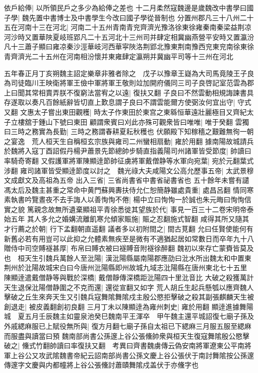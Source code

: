 依戶給俸|{
	以所領民戶之多少為給俸之差也}
十二月柔然寇魏邊是歲魏改中書學曰國子學|{
	魏先置中書博士及中書學生今改曰國子學從晉制也}
分置州郡凡三十八州二十五在河南十三在河北|{
	河南二十五州青南青兖齊濟光豫洛徐東徐雍秦南秦梁益荆凉河沙時又置華陜夏岐班郢凡二十五河北十三州司并肆定相冀幽燕營平安時又置瀛汾凡十三蕭子顯曰雍凉秦沙涇華岐河西華寜陜洛荆郢北豫東荆南豫西兖東兖南徐東徐青齊濟光二十五州在河南相汾懷并東雍肆定瀛朔并冀幽平司等十三州在河北}


五年春正月丁亥朔魏主詔定樂章非雅者除之　戊子以豫章王嶷為大司馬竟陵王子良為司徒臨川王映衛將軍王儉中軍將軍王敬則竝加開府儀同三司子良啓記室范雲為郡上曰聞其常相賣弄朕不復窮法當宥之以遠|{
	復扶又翻}
子良曰不然雲動相規誨諫書具存遂取以奏凡百餘紙辭皆切直上歎息謂子良曰不謂雲能爾方使弼汝何宜出守|{
	守式又翻}
文惠太子嘗出東田觀穫|{
	時太子作東田於東宫之東緜恒華遠壯麗極目又齊紀太子立樓舘于鍾山下號曰東田}
顧謂衆賓曰刈此亦殊可觀衆皆曰唯唯|{
	唯于癸翻}
雲獨曰三時之務實為長勤|{
	三時之務謂春耕夏耘秋穫也}
伏願殿下知稼穡之艱難無徇一朝之宴逸　荒人桓天生自稱桓玄宗族與雍司二州蠻相扇動|{
	雍於用翻}
據南陽故城請兵於魏將入寇丁酉詔假丹楊尹蕭景先節總帥步騎直指義陽司州諸軍皆受節度|{
	帥讀曰率騎奇寄翻}
又假護軍將軍陳顯逹節帥征虜將軍戴僧静等水軍向宛葉|{
	宛於元翻葉式涉翻}
雍司諸軍皆受顯逹節度以討之　魏光祿大夫咸陽文公高允歷事五帝|{
	太武景穆文成獻文及高祖為五帝}
出入三省|{
	三省尚書省中書省祕書省也}
五十餘年未嘗有譴馮太后及魏主甚重之常命中黄門蘇興夀扶侍允仁恕簡静雖處貴重|{
	處昌呂翻}
情同寒素執書吟覽晝夜不去手誨人以善恂恂不倦|{
	楊中立曰恂恂一於誠也朱元晦曰恂恂信實之貌}
篤親念故無所遺棄顯祖平青徐悉徙其望族於代|{
	事見一百三十二卷宋明帝泰始五年}
其人多允之婚媾流離飢寒允傾家賑施|{
	賑之忍翻施式智翻}
咸得其所又隨其才行薦之於朝|{
	行下孟翻朝直遥翻}
議者多以初附間之|{
	間古莧翻}
允曰任賢使能何有新舊必若有用豈可以此抑之允體素無疾至是微有不適猶起居如常數日而卒年九十八贈侍中司空賻襚甚厚|{
	布帛曰賻衣被曰襚賻音附襚徐醉翻}
魏初以來存亡蒙賚皆莫及也　桓天生引魏兵萬餘人至沘陽|{
	漢沘陽縣屬南陽郡應劭曰沘水所出魏太和中置東荆州於沘陽故城宋白曰今唐州沘陽縣即州故城九域志沘陽縣在唐州東北七十五里}
陳顯逹遣戴僧静等與戰於深橋|{
	戴僧靜傳深橋距沘陽四十里沘音比}
大破之殺獲萬計天生退保沘陽僧静圍之不克而還|{
	還從宣翻又如字}
荒人胡丘生起兵懸瓠以應齊魏人擊破之丘生來奔天生又引魏兵寇舞隂舞隂戍主殷公愍拒擊破之殺其副張麒麟天生被創退走|{
	被皮義翻創初良翻}
三月丁未以陳顯逹為雍州刺史|{
	雍於用翻}
顯逹進據舞陽城　夏五月壬辰魏主如靈泉池癸巳魏南平王渾卒　甲午魏主還平城詔復七廟子孫及外戚緦麻服已上賦役無所與|{
	復方月翻七廟子孫自太祖已下緦麻三月服五服至緦麻而服盡與讀當曰預}
魏南部尚書公孫邃上谷公張儵帥衆與桓天生復寇舞隂殷公愍擊破之|{
	儵式竹翻帥讀曰率復扶又翻　考異曰齊書魏虜傳云偽安南將軍遼東公平南將軍上谷公又攻武隂魏書帝紀云詔南部尚書公孫文慶上谷公張伏于南討舞隂按公孫邃傳邃字文慶與内都幢將上谷公張儵討蕭賾舞隂戍盖伏于亦儵字也}
